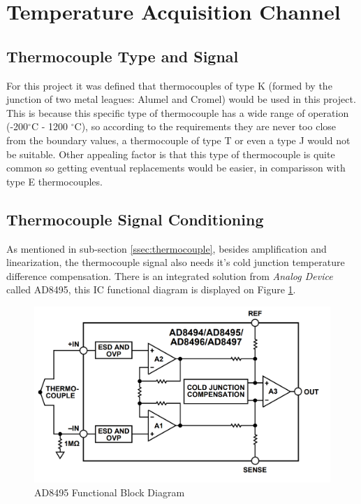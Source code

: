 \section{Temperature Acquisition Channel}

	\subsection{Thermocouple Type and Signal}	
			
	 For this project it was defined that thermocouples of type K (formed by the junction of two metal leagues: Alumel and Cromel) would be used in this project. This is because this specific type of thermocouple has a wide range of operation (-200$^{\circ}$C - 1200 $^{\circ}$C), so according to the requirements they are never too close from the boundary values, a thermocouple of type T or even a type J would not be suitable. Other appealing factor is that this type of thermocouple is quite common so getting eventual replacements would be easier, in comparisson with type E thermocouples.

	\subsection{Thermocouple Signal Conditioning}\label{ssec:thermocouple-signal-conditioning}
	
	As mentioned in sub-section \ref{ssec:thermocouple}, besides amplification and linearization, the thermocouple signal also needs it's cold junction temperature difference compensation. There is an integrated solution from \textit{Analog Device} called AD8495, this IC functional diagram is displayed on Figure \ref{fig:ad8495-functional-block}.
	
		\begin{figure}[htbp]
			\centering
				\includegraphics[scale=0.65]{figuras/fig-ad8495-functional-block}
			\caption{AD8495 Functional Block Diagram \cite{ad8495-functional-block}}
			\label{fig:ad8495-functional-block}
		\end{figure}
		
